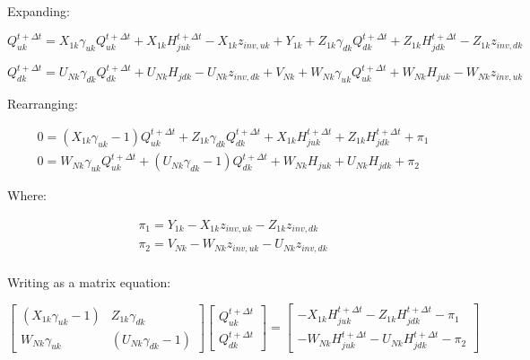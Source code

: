 \documentclass[11pt]{article}
\begin{document}
Expanding:

\begin{equation}
   Q_{uk}^{t + \Delta t} = X_{1k} \gamma_{uk} Q_{uk}^{t + \Delta t} + X_{1k} H_{juk}^{t + \Delta t} - X_{1k} z_{inv, uk} + Y_{1k} + Z_{1k} \gamma_{dk} Q_{dk}^{t + \Delta t} + Z_{1k} H_{jdk}^{t + \Delta t} - Z_{1k} z_{inv, dk}
\end{equation}

\begin{equation}
  Q_{dk}^{t + \Delta t} = U_{Nk} \gamma_{dk} Q_{dk}^{t + \Delta t} + U_{Nk} H_{jdk} - U_{Nk} z_{inv, dk}
  + V_{Nk} + W_{Nk} \gamma_{uk} Q_{uk}^{t + \Delta t} + W_{Nk} H_{juk} - W_{Nk} z_{inv, uk}
\end{equation}

Rearranging:

\begin{align}
   0 = ( X_{1k} \gamma_{uk} - 1) Q_{uk}^{t + \Delta t} + Z_{1k} \gamma_{dk} Q_{dk}^{t + \Delta t} + X_{1k} H_{juk}^{t + \Delta t} + Z_{1k} H_{jdk}^{t + \Delta t} + \pi_1 \\
   0 = W_{Nk} \gamma_{uk} Q_{uk}^{t + \Delta t} + (U_{Nk} \gamma_{dk} - 1) Q_{dk}^{t + \Delta t} + W_{Nk} H_{juk} + U_{Nk} H_{jdk} + \pi_2
\end{align}

Where:

\begin{align}
 \pi_1 = Y_{1k} - X_{1k} z_{inv, uk} - Z_{1k} z_{inv, dk} \\ 
 \pi_2 = V_{Nk} - W_{Nk} z_{inv, uk} - U_{Nk} z_{inv, dk} \\ 
\end{align}

Writing as a matrix equation:

\begin{equation}
  \begin{bmatrix}
    (X_{1k} \gamma_{uk} - 1) & Z_{1k} \gamma_{dk} \\
    W_{Nk} \gamma_{uk} & (U_{Nk} \gamma_{dk} - 1)
  \end{bmatrix}
  \begin{bmatrix}
   Q_{uk}^{t + \Delta t} \\ Q_{dk}^{t + \Delta t} 
  \end{bmatrix}
  =
  \begin{bmatrix}
   - X_{1k} H_{juk}^{t + \Delta t} - Z_{1k} H_{jdk}^{t + \Delta t} - \pi_1 \\ 
   - W_{Nk} H_{juk}^{t + \Delta t} - U_{Nk} H_{jdk}^{t + \Delta t} - \pi_2
  \end{bmatrix}
\end{equation}
\end{document}
